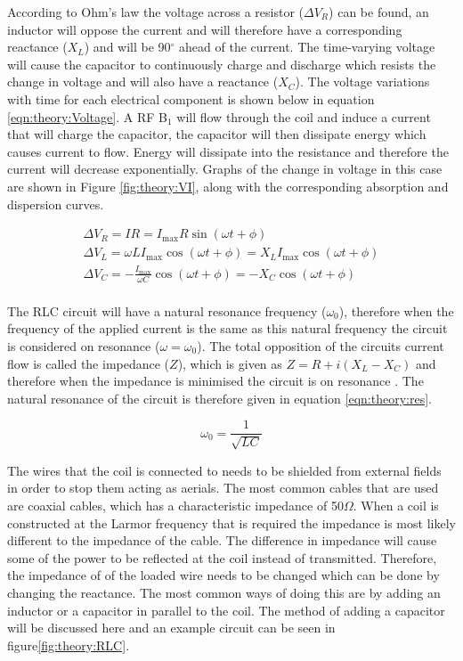 According to Ohm's law the voltage across a resistor ($\Delta V_R$) can be found, an inductor will oppose the current and will therefore have a corresponding reactance ($X_L$) and will be 90$^\circ$ ahead of the current. The time-varying voltage will cause the capacitor to continuously charge and discharge which resists the change in voltage and will also have a reactance ($X_C$). The voltage variations with time for each electrical component is shown below in equation \ref{eqn:theory:Voltage}. A \ac{RF} B$_1$ will flow through the coil and induce a current that will charge the capacitor, the capacitor will then dissipate energy which causes current to flow. Energy will dissipate into the resistance and therefore the current will decrease exponentially. Graphs of the change in voltage in this case are shown in Figure \ref{fig:theory:VI}, along with the corresponding absorption and dispersion curves.  

\begin{equation}
\begin{gathered}
    \Delta V_R = IR = I_{\mathrm{max}}R\sin(\omega t + \phi) \\
    \Delta V_L = \omega LI_{\mathrm{max}}\cos(\omega t + \phi) =  X_LI_{\mathrm{max}}\cos(\omega t + \phi)\\
    \Delta V_C = -\frac{I_{\mathrm{max}}}{\omega C}\cos(\omega t + \phi) = -X_C\cos(\omega t + \phi)\\
    \label{eqn:theory:Voltage}
\end{gathered}
\end{equation}

The RLC circuit will have a natural resonance frequency ($\omega_0$), therefore when the frequency of the applied current is the same as this natural frequency the circuit is considered on resonance ($\omega=\omega_0$). The total opposition of the circuits current flow is called the impedance ($Z$), which is given as $Z = R+i(X_L-X_C)$ and therefore when the impedance is minimised the circuit is on resonance \cite{deGraaf2019InSpectroscopy}. The natural resonance of the circuit is therefore given in equation \ref{eqn:theory:res}.

\begin{equation}
    \omega_0 = \frac{1}{\sqrt{LC}}
    \label{eqn:theory:res}
\end{equation}

The wires that the coil is connected to needs to be shielded from external fields in order to stop them acting as aerials. The most common cables that are used are coaxial cables, which has a characteristic impedance of 50$\Omega$. When a coil is constructed at the Larmor frequency that is required the impedance is most likely different to the impedance of the cable. The difference in impedance will cause some of the power to be reflected at the coil instead of transmitted. Therefore, the impedance of of the loaded wire needs to be changed which can be done by changing the reactance. The most common ways of doing this are by adding an inductor or a capacitor in parallel to the coil. The method of adding a capacitor will be discussed here and an example circuit can be seen in figure\ref{fig:theory:RLC}.

